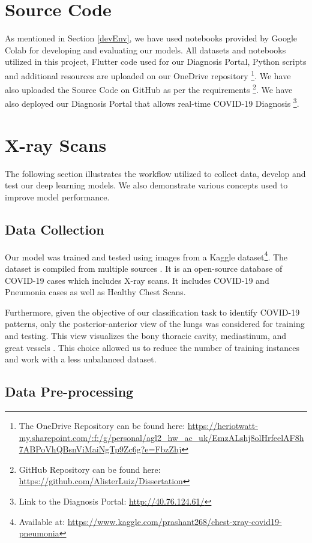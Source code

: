 \section{Source Code}

As mentioned in Section \ref{devEnv}, we have used notebooks provided by Google Colab for developing and evaluating our models. All datasets and notebooks utilized in this project, Flutter code used for our Diagnosis Portal, Python scripts and additional resources are uploaded on our OneDrive repository \footnote{The OneDrive Repository can be found here: \url{https://heriotwatt-my.sharepoint.com/:f:/g/personal/agl2_hw_ac_uk/EmzALshj8olHrfeelAF8h7ABPoVhQBsnViMaiNgTp9Zc6g?e=FbzZhj}}. We have also uploaded the Source Code on GitHub as per the requirements \footnote{GitHub Repository can be found here: \url{https://github.com/AlisterLuiz/Dissertation}}. We have also deployed our Diagnosis Portal that allows real-time COVID-19 Diagnosis \footnote{Link to the Diagnosis Portal: \url{http://40.76.124.61/}}.


\section{X-ray Scans}
The following section illustrates the workflow utilized to collect data, develop and test our deep learning models. We also demonstrate various concepts used to improve model performance.

\subsection{Data Collection}

Our model was trained and tested using images from a Kaggle dataset\footnote{Available at: \url{https://www.kaggle.com/prashant268/chest-xray-covid19-pneumonia}}. The dataset is compiled from multiple  sources \cite{GAN2020, MOO2018, AGC2020}. It is an open-source database of COVID-19 cases which includes X-ray scans. It includes COVID-19 and Pneumonia cases as well as Healthy Chest Scans.


Furthermore, given the objective of our classification task to identify COVID-19 patterns, only the posterior-anterior view of the lungs was considered for training and testing. This view visualizes the bony thoracic cavity, mediastinum, and great vessels \cite{MUR2020}. This choice allowed us to reduce the number of training instances and work with a less unbalanced dataset. 

\subsection{Data Pre-processing}

